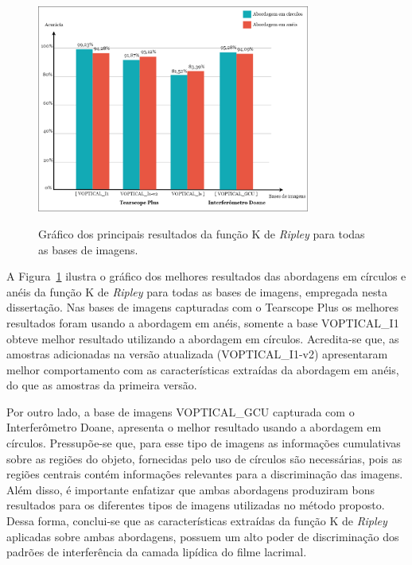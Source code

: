 \begin{figure}[!ht]
    \centering
    \caption{Gráfico dos principais resultados da função K de \textit{Ripley} para todas as bases de imagens.}
    \includegraphics[width=0.8\textwidth]{figs/graficoKRipley1.png}
    \label{fig:graficoKRipley}
\end{figure}

A Figura~\ref{fig:graficoKRipley} ilustra o gráfico dos melhores resultados das abordagens em círculos e anéis da função K de \textit{Ripley} para todas as bases de imagens, empregada nesta dissertação. Nas bases de imagens capturadas com o Tearscope Plus os melhores resultados foram usando a abordagem em anéis, somente a base VOPTICAL\_I1 obteve melhor resultado utilizando a abordagem em círculos. Acredita-se que, as amostras adicionadas na versão atualizada (VOPTICAL\_I1-v2) apresentaram melhor comportamento com as características extraídas da abordagem em anéis, do que as amostras da primeira versão.

Por outro lado, a base de imagens VOPTICAL\_GCU capturada com o Interferômetro Doane, apresenta o melhor resultado usando a abordagem em círculos. Pressupõe-se que, para esse tipo de imagens as informações cumulativas sobre as regiões do objeto, fornecidas pelo uso de círculos são necessárias, pois as regiões centrais contém informações relevantes para a discriminação das imagens. Além disso, é importante enfatizar que ambas abordagens produziram bons resultados para os diferentes tipos de imagens utilizadas no método proposto. Dessa forma, conclui-se que as características extraídas da função K de \textit{Ripley} aplicadas sobre ambas abordagens, possuem um alto poder de discriminação dos padrões de interferência da camada lipídica do filme lacrimal.

